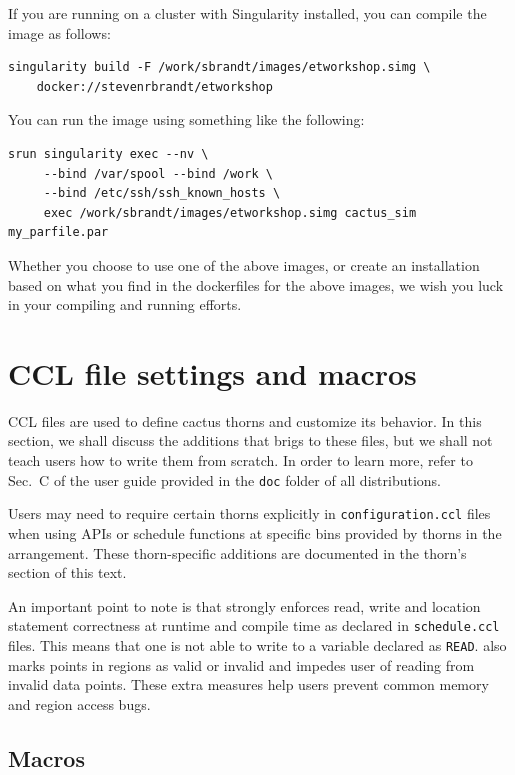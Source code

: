 If you are running on a cluster with Singularity installed, you can compile the image as follows:

\begin{lstlisting}
singularity build -F /work/sbrandt/images/etworkshop.simg \
    docker://stevenrbrandt/etworkshop
\end{lstlisting}

You can run the image using something like the following:
\begin{lstlisting}
srun singularity exec --nv \
     --bind /var/spool --bind /work \
     --bind /etc/ssh/ssh_known_hosts \
     exec /work/sbrandt/images/etworkshop.simg cactus_sim my_parfile.par
\end{lstlisting}

Whether you choose to use one of the above images, or create an installation based on what you find in the dockerfiles for the above images, we wish you luck in your compiling and running efforts.

\section{CCL file settings and macros}
\label{sec:ccl_files}
CCL files are used to define cactus thorns and customize its behavior. In this section, we shall discuss the additions that \CarpetX\space brigs to these files, but we shall not teach users how to write them from scratch. In order to learn more, refer to Sec.~C of the \Cactus\space user guide provided in the \texttt{doc} folder of all distributions.

Users may need to require certain thorns explicitly in \texttt{configuration.ccl} files when using \CarpetX\space APIs or schedule functions at specific bins provided by thorns in the \CarpetX\space arrangement. These thorn-specific additions are documented in the thorn's section of this text.

An important point to note is that \CarpetX\space strongly enforces read, write and location statement correctness at runtime and compile time as declared in \texttt{schedule.ccl} files. This means that one is not able to write to a variable declared as \texttt{READ}. \CarpetX\space also marks points in regions as valid or invalid and impedes user of reading from invalid data points. These extra measures help users prevent common memory and region access bugs. 

\subsection{Macros}

